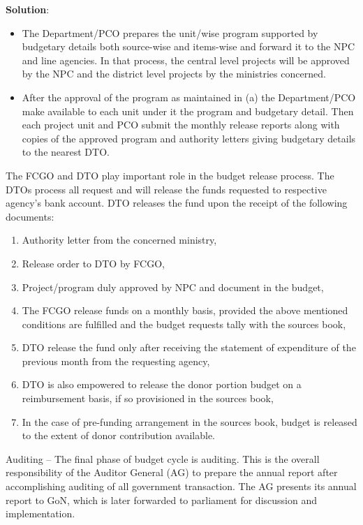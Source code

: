 \documentclass[
]{book}
\newenvironment{solution}{ {\bfseries Solution}:}{}
\begin{document}
\begin{questions}
\begin{solution}
\begin{itemize}
\item The Department/PCO prepares the unit/wise program supported by budgetary details both source-wise and items-wise and forward it to the NPC and line agencies. In that process, the central level projects will be approved by the NPC and the district level projects by the ministries concerned.
\item After the approval of the program as maintained in (a) the Department/PCO make available to each unit under it the program and budgetary detail. Then each project unit and PCO submit the monthly release reports along with copies of the approved program and authority letters giving budgetary details to the nearest DTO.
\end{itemize}

The FCGO and DTO play important role in the budget release process. The DTOs process all request and will release the funds requested to respective agency's bank account. DTO releases the fund upon the receipt of the following documents:

\begin{enumerate}
\item Authority letter from the concerned ministry,
\item Release order to DTO by FCGO,
\item Project/program duly approved by NPC and document in the budget,
\item The FCGO release funds on a monthly basis, provided the above mentioned conditions are fulfilled and the budget requests tally with the sources book,
\item DTO release the fund only after receiving the statement of expenditure of the previous month from the requesting agency,
\item DTO is also empowered to release the donor portion budget on a reimbursement basis, if so provisioned in the sources book,
\item In the case of pre-funding arrangement in the sources book, budget is released to the extent of donor contribution available.
\end{enumerate}

Auditing -- The final phase of budget cycle is auditing. This is the overall responsibility of the Auditor General (AG) to prepare the annual report after accomplishing auditing of all government transaction. The AG presents its annual report to GoN, which is later forwarded to parliament for discussion and implementation.


\end{solution}
\end{questions}
\end{document}
